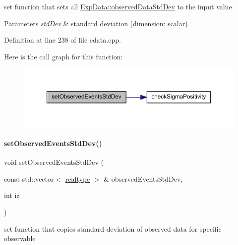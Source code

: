 set function that sets all \mbox{\hyperlink{classamici_1_1_exp_data_aa097568cebb4be48c4c1dfaab0c2a159}{Exp\+Data\+::observed\+Data\+Std\+Dev}} to the input value


\begin{DoxyParams}{Parameters}
{\em std\+Dev} & standard deviation (dimension\+: scalar) \\
\hline
\end{DoxyParams}


Definition at line 238 of file edata.\+cpp.

Here is the call graph for this function\+:
\nopagebreak
\begin{figure}[H]
\begin{center}
\leavevmode
\includegraphics[width=350pt]{classamici_1_1_exp_data_a7be54ad0b0116325f4955f10a759a018_cgraph}
\end{center}
\end{figure}
\mbox{\label{classamici_1_1_exp_data_a9fe1de066fcba20ce994d9817442a826}} 
\paragraph{\texorpdfstring{set\+Observed\+Events\+Std\+Dev()}{setObservedEventsStdDev()}\hspace{0.1cm}{\footnotesize\ttfamily [3/4]}}
{\footnotesize\ttfamily void set\+Observed\+Events\+Std\+Dev (\begin{DoxyParamCaption}\item[{const std\+::vector$<$ \mbox{\hyperlink{namespaceamici_a1bdce28051d6a53868f7ccbf5f2c14a3}{realtype}} $>$ \&}]{observed\+Events\+Std\+Dev,  }\item[{int}]{iz }\end{DoxyParamCaption})}

set function that copies standard deviation of observed data for specific observable


